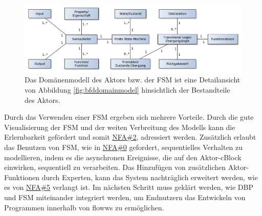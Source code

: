 \begin{figure}[h]
  \centering
  \includegraphics[width=1\textwidth]{bilder/chapter4/chapter4_2/domainmodellaktor.pdf}
  \caption{Das Domänenmodell des Aktors bzw. der \ac{FSM} ist eine Detailansicht von Abbildung \ref{fig:bfddomainmodel} hinsichtlich der Bestandteile des Aktors. }
  \label{fig:domainmodelfsm}
\end{figure}

Durch das Verwenden einer \ac{FSM} ergeben sich mehrere Vorteile. Durch die gute Visualisierung der \ac{FSM} und der weiten Verbreitung des Modells kann die Erlernbarkeit gefördert und somit \hyperref[tab:NFA2]{NFA\#2}, adressiert werden. Zusätzlich erlaubt das Benutzen von \ac{FSM}, wie in  \hyperref[tab:NFA0]{NFA\#0} gefordert, sequentielles Verhalten zu modellieren, indem es die asynchronen Ereignisse, die auf den Aktor-cBlock einwirken, sequentiell zu verarbeiten. Das Hinzufügen von zusätzlichen Aktor-Funktionen durch Experten, kann das System nachträglich erweitert werden, wie es von  \hyperref[tab:NFA5]{NFA\#5} verlangt ist. Im nächsten Schritt muss geklärt werden, wie \ac{DBP} und \ac{FSM} miteinander integriert werden, um Endnutzern das Entwickeln von Programmen innerhalb von flowws zu ermöglichen.